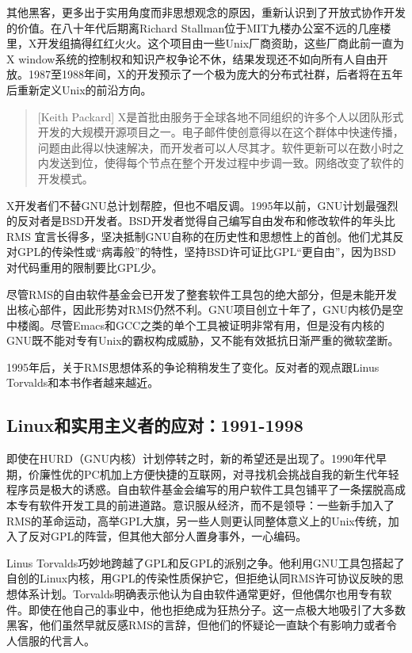 \documentclass[11pt,oneside]{book}
\begin{document}
\begin{common-format}
其他黑客，更多出于实用角度而非思想观念的原因，重新认识到了开放式协作开发的价值。在八十年代后期离Richard Stallman位于MIT九楼办公室不远的几座楼里，X开发组搞得红红火火。这个项目由一些Unix厂商资助，这些厂商此前一直为X window系统的控制权和知识产权争论不休，结果发现还不如向所有人自由开放。1987至1988年间，X的开发预示了一个极为庞大的分布式社群，后者将在五年后重新定义Unix的前沿方向。

\begin{quote}[Keith Packard]
X是首批由服务于全球各地不同组织的许多个人以团队形式开发的大规模开源项目之一。电子邮件使创意得以在这个群体中快速传播，问题由此得以快速解决，而开发者可以人尽其才。软件更新可以在数小时之内发送到位，使得每个节点在整个开发过程中步调一致。网络改变了软件的开发模式。
\end{quote}

X开发者们不替GNU总计划帮腔，但也不唱反调。1995年以前，GNU计划最强烈的反对者是BSD开发者。BSD开发者觉得自己编写自由发布和修改软件的年头比RMS
宜言长得多，坚决抵制GNU自称的在历史性和思想性上的首创。他们尤其反对GPL的传染性或“病毒般”的特性，坚持BSD许可证比GPL“更自由”，因为BSD对代码重用的限制要比GPL少。

尽管RMS的自由软件基金会已开发了整套软件工具包的绝大部分，但是未能开发出核心部件，因此形势对RMS仍然不利。GNU项目创立十年了，GNU内核仍是空中楼阁。尽管Emacs和GCC之类的单个工具被证明非常有用，但是没有内核的GNU既不能对专有Unix的霸权构成威胁，又不能有效抵抗日渐严重的微软垄断。

1995年后，关于RMS思想体系的争论稍稍发生了变化。反对者的观点跟Linus Torvalds和本书作者越来越近。


\subsection{Linux和实用主义者的应对：1991-1998}
即使在HURD（GNU内核）计划停转之时，新的希望还是出现了。1990年代早期，价廉性优的PC机加上方便快捷的互联网，对寻找机会挑战自我的新生代年轻程序员是极大的诱惑。自由软件基金会编写的用户软件工具包铺平了一条摆脱高成本专有软件开发工具的前进道路。意识服从经济，而不是领导：一些新手加入了RMS的革命运动，高举GPL大旗，另一些人则更认同整体意义上的Unix传统，加入了反对GPL的阵营，但其他大部分人置身事外，一心编码。

Linus Torvalds巧妙地跨越了GPL和反GPL的派别之争。他利用GNU工具包搭起了自创的Linux内核，用GPL的传染性质保护它，但拒绝认同RMS许可协议反映的思
想体系计划。Torvalds明确表示他认为自由软件通常更好，但他偶尔也用专有软件。即使在他自己的事业中，他也拒绝成为狂热分子。这一点极大地吸引了大多数黑客，他们虽然早就反感RMS的言辞，但他们的怀疑论一直缺个有影响力或者令人信服的代言人。


\end{common-format}
\end{document}
